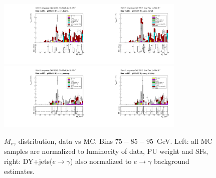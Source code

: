 \begin{figure}[htb]
\begin{center}
    \includegraphics[width=0.40\textwidth]{../figs/figs_v11/ELECTRON_WGamma/PrepareYields/c_TotalDATAvsMC_Barrel__Mpholep1PRELIMINARY_FOR_E_TO_GAMMA_WITH_PSV_CUT_pt85to95_.pdf}\includegraphics[width=0.40\textwidth]{../figs/figs_v11/ELECTRON_WGamma/PrepareYields/c_TotalDATAvsMC_Barrel__Mpholep1PRELIMINARY_FOR_E_TO_GAMMA_WITH_PSV_CUT_pt85to95__etogScale.pdf}\\ 
    \includegraphics[width=0.40\textwidth]{../figs/figs_v11/ELECTRON_WGamma/PrepareYields/c_TotalDATAvsMC_Endcap__Mpholep1PRELIMINARY_FOR_E_TO_GAMMA_WITH_PSV_CUT_pt85to95_.pdf}\includegraphics[width=0.40\textwidth]{../figs/figs_v11/ELECTRON_WGamma/PrepareYields/c_TotalDATAvsMC_Endcap__Mpholep1PRELIMINARY_FOR_E_TO_GAMMA_WITH_PSV_CUT_pt85to95__etogScale.pdf}\\
   \label{fig:Mpholep1DatavsMC_75to500}
  \caption{$M_{e\gamma}$ distribution, data vs MC. Bins $75-85-95$~GeV. Left: all MC samples are normalized to luminocity of data, PU weight and SFs, right: DY+jets($e\rightarrow\gamma$) also normalized to $e\rightarrow\gamma$ background estimates.}
  \end{center}
\end{figure}

